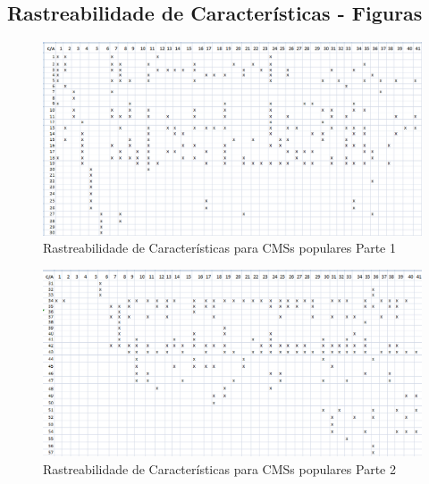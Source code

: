 \begin{apendicesenv}
\section{Rastreabilidade de Características - Figuras}
\label{Rastreabilidade_características_apendice}
\begin{landscape}
\begin{figure}[h]
\centering
\includegraphics[keepaspectratio=true,scale=0.9]{figuras/Figura_1.png}
\caption{Rastreabilidade de Características para CMSs populares Parte 1}
\label{Rastreabuilidade_Popular_1}
\end{figure}
\end{landscape}

\begin{landscape}
\begin{figure}[h]
\centering
\includegraphics[keepaspectratio=true,scale=0.9]{figuras/Figura_2.png}
\caption{Rastreabilidade de Características para CMSs populares Parte 2}
\label{Rastreabuilidade_Popular_2}
\end{figure}
\end{landscape}



\end{apendicesenv}
